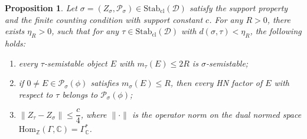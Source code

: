 \documentclass[a4paper,12pt]{amsart}
\numberwithin{equation}{section}
\newtheorem{proposition}[theorem]{Proposition}
\newcommand{\Hom}{\mathrm{Hom}}
\newcommand{\Stab}{\mathrm{Stab}}
\newcommand{\cl}{\mathrm{cl}}
\newcommand{\1}{\mathbf{1}}
\begin{document}
\begin{proposition}\label{nearby}
    Let $\sigma=(Z_\sigma,\mathcal{P}_\sigma)\in\Stab_\cl(\mathcal{D})$ satisfy the support property and the finite counting condition with support constant $c$. For any $R>0$, there exists $\eta_R>0$, such that for any $\tau\in\Stab_\cl(\mathcal{D})$ with $d(\sigma,\tau)<\eta_R$, the following holds:

    \begin{enumerate}
        \item every $\tau$-semistable object $E$ with $m_\tau(E)\leqslant2R$ is $\sigma$-semistable;
        \item if $0\neq E\in\mathcal{P}_\sigma(\phi)$ satisfies $m_\sigma(E)\leqslant R$, then every HN factor of $E$ with respect to $\tau$ belongs to $\mathcal{P}_\sigma(\phi)$;
        \item $\|Z_\tau-Z_\sigma\|\leqslant\dfrac{c}4$, where $\|\cdot\|$ is the operator norm on the dual normed space $\Hom_\mathbb{Z}(\Gamma,\mathbb{C})=\Gamma_\mathbb{C}^*$.
    \end{enumerate}
\end{proposition}
\end{document}

